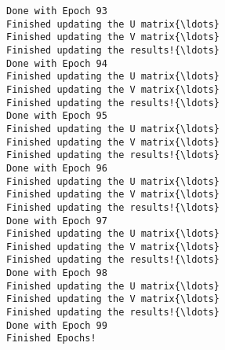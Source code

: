 \documentclass{article}
\begin{document}
\begin{Verbatim}[commandchars=\\\{\}]
Done with Epoch 93
Finished updating the U matrix{\ldots}
Finished updating the V matrix{\ldots}
Finished updating the results!{\ldots}
Done with Epoch 94
Finished updating the U matrix{\ldots}
Finished updating the V matrix{\ldots}
Finished updating the results!{\ldots}
Done with Epoch 95
Finished updating the U matrix{\ldots}
Finished updating the V matrix{\ldots}
Finished updating the results!{\ldots}
Done with Epoch 96
Finished updating the U matrix{\ldots}
Finished updating the V matrix{\ldots}
Finished updating the results!{\ldots}
Done with Epoch 97
Finished updating the U matrix{\ldots}
Finished updating the V matrix{\ldots}
Finished updating the results!{\ldots}
Done with Epoch 98
Finished updating the U matrix{\ldots}
Finished updating the V matrix{\ldots}
Finished updating the results!{\ldots}
Done with Epoch 99
Finished Epochs!
    \end{Verbatim}
\end{document}
